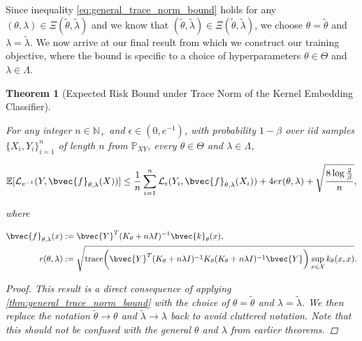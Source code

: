 \documentclass{article}
\newtheorem{theorem}{Theorem}[section]
\begin{document}
		Since inequality \eqref{eq:general_trace_norm_bound} holds for any $(\theta, \lambda) \in \Xi(\tilde{\theta}, \tilde{\lambda})$ and we know that $(\tilde{\theta}, \tilde{\lambda}) \in \Xi(\tilde{\theta}, \tilde{\lambda})$, we choose $\theta = \tilde{\theta}$ and $\lambda = \tilde{\lambda}$.  We now arrive at our final result from which we construct our training objective, where the bound is specific to a choice of hyperparameters $\theta \in \Theta$ and $\lambda \in \Lambda$.
		
		\begin{theorem}[Expected Risk Bound under Trace Norm of the Kernel Embedding Classifier]
			\label{thm:trace_norm_bound}
			
			For any integer $n \in \mathbb{N}_{+}$ and $\epsilon \in (0, e^{-1})$, with probability $1 - \beta$ over \textit{iid} samples $\{X_{i}, Y_{i}\}_{i = 1}^{n}$ of length $n$ from $\mathbb{P}_{X Y}$, every $\theta \in \Theta$ and $\lambda \in \Lambda$,
			
			\begin{equation}
				\mathbb{E}[\mathcal{L}_{e^{-1}}(Y, \bvec{f}_{\theta, \lambda}(X))] \leq \frac{1}{n} \sum_{i = 1}^{n} \mathcal{L}_{\epsilon}(Y_{i}, \bvec{f}_{\theta, \lambda}(X_{i})) + 4 e r(\theta, \lambda) + \sqrt{\frac{8 \log{\frac{2}{\beta}}}{n}},
			\label{eq:trace_norm_bound}
			\end{equation}
			
			where 
			
			\begin{equation}
				\begin{aligned}
					\bvec{f}_{\theta, \lambda}(x) &:= \bvec{Y}^{T} (K_{\theta} + n \lambda I)^{-1} \bvec{k}_{\theta}(x), \\
					r(\theta, \lambda) &:= \sqrt{\mathrm{trace}\bigg(\bvec{Y}^{T} (K_{\theta} + n \lambda I)^{-1} K_{\theta} (K_{\theta} + n \lambda I)^{-1} \bvec{Y}\bigg) \sup_{x \in \mathcal{X}} k_{\theta}(x, x)}.
				\end{aligned}
			\end{equation}
			
			\begin{proof}
				This result is a direct consequence of applying \cref{thm:general_trace_norm_bound} with the choice of $\theta = \tilde{\theta}$ and $\lambda = \tilde{\lambda}$. We then replace the notation $\tilde{\theta} \rightarrow \theta$ and $\tilde{\lambda} \rightarrow \lambda$ back to avoid cluttered notation. Note that this should not be confused with the general $\theta$ and $\lambda$ from earlier theorems.
			\end{proof}
		\end{theorem}
		
\end{document}
